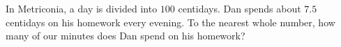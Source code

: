 In Metriconia, a day is divided into $100$ centidays. Dan spends about $7.5$ centidays on his homework every evening. To the nearest whole number, how many of our minutes does Dan spend on his homework?
